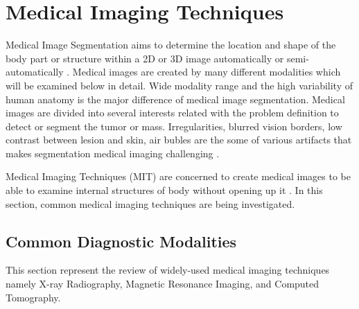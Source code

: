 \section{Medical Imaging Techniques}

    Medical Image Segmentation aims to determine the location and shape of the body part or structure within a 2D or 3D image automatically or semi-automatically \cite{merjulah2019classification}.
    Medical images are created by many different modalities which will be examined below in detail.
    Wide modality range and the high variability of human anatomy is the major difference of medical image segmentation.
    Medical images are divided into several interests related with the problem definition to detect or segment the tumor or mass.
    Irregularities, blurred vision borders, low contrast between lesion and skin, air bubles are the some of various artifacts that makes segmentation medical imaging challenging \cite{guo2019neutrosophic}.

    Medical Imaging Techniques (MIT) are concerned to create medical images to be able to examine internal structures of body without opening up it \cite{kasban2015comparative}.
    In this section, common medical imaging techniques are being investigated.

    \subsection{Common Diagnostic Modalities}

        

        This section represent the review of widely-used medical imaging techniques namely X-ray Radiography, Magnetic Resonance Imaging, and Computed Tomography.

